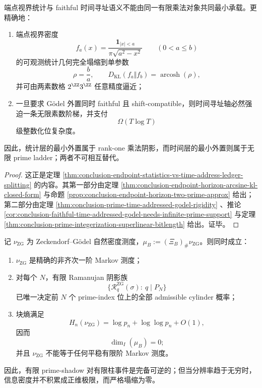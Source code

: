 \begin{theorem}[统计阴影与时间语义的最小外置必发生二层分裂]\label{thm:derived-rankone-statistics-infinite-prime-time-splitting}
端点视界统计与 faithful 时间寻址语义不能由同一有限乘法对象共同最小承载。更精确地：
\begin{enumerate}
\normalfont
  \item 端点视界密度
  \[
  f_a(x)=\frac{\mathbf 1_{|x|<a}}{\pi\sqrt{a^2-x^2}}
  \qquad (0<a\le b)
  \]
  的可观测统计几何完全塌缩到单参数
  \[
  \rho=\frac ba,
  \qquad
  D_{\mathrm{KL}}(f_a\Vert f_b)=\operatorname{arcosh}(\rho),
  \]
  并可由两素数格 \(2^{\ZZ}3^{\ZZ}\) 任意精度逼近；
  \item 一旦要求 Gödel 外置同时 faithful 且 shift-compatible，则时间寻址轴必然强迫一条无限素数阶梯，并支付
  \[
  \Omega(T\log T)
  \]
  级整数化位复杂度。
\end{enumerate}
因此，统计层的最小外置属于 rank-one 乘法阴影，而时间层的最小外置则属于无限 prime ladder；两者不可相互替代。
\end{theorem}

\begin{proof}
这正是定理
\ref{thm:conclusion-endpoint-statistics-vs-time-address-ledger-splitting}
的内容。其第一部分由定理
\ref{thm:conclusion-endpoint-horizon-arcsine-kl-closed-form}
与命题
\ref{prop:conclusion-endpoint-horizon-two-prime-approx}
给出；第二部分由定理
\ref{thm:conclusion-prime-time-addressed-godel-rigidity}
、推论
\ref{cor:conclusion-faithful-time-addressed-godel-needs-infinite-prime-support}
与定理
\ref{thm:conclusion-prime-integerization-superlinear-bitlength}
给出。证毕。
\end{proof}

\begin{theorem}\label{thm:derived-zg-finite-shadow-complete-but-zero-information-dimension}
记 \(\nu_{\mathrm{ZG}}\) 为 Zeckendorf--Gödel 自然密度测度，\(\mu_B:=(\Xi_B)_\#\nu_{\mathrm{ZG}}\)。则同时成立：
\begin{enumerate}
\normalfont
  \item \(\nu_{\mathrm{ZG}}\) 是精确的非齐次一阶 Markov 测度；
  \item 对每个 \(N\)，有限 Ramanujan 阴影族
  \[
  \{\mathcal R_q^{\mathrm{ZG}}(\sigma):\ q\mid P_N\}
  \]
  已唯一决定前 \(N\) 个 prime-index 位上的全部 admissible cylinder 概率；
  \item 块熵满足
  \[
  H_n(\nu_{\mathrm{ZG}})=\log p_n+\log\log p_n+O(1),
  \]
  因而
  \[
  \dim_I(\mu_B)=0;
  \]
  并且 \(\nu_{\mathrm{ZG}}\) 不能等于任何平稳有限阶 Markov 测度。
\end{enumerate}
因此，有限 prime-shadow 对有限柱事件是完备可逆的；但当分辨率趋于无穷时，信息密度并不积累成正维极限，而严格塌缩为零。
\end{theorem}

